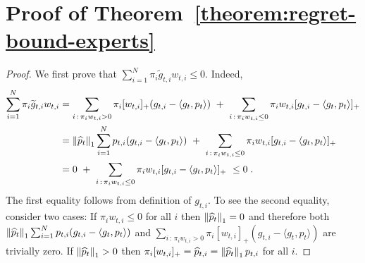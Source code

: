 \section{Proof of Theorem~\ref{theorem:regret-bound-experts}}
\label{section:appendix-expert-reduction}

\begin{proof}
We first prove that $\sum_{i=1}^N \pi_i \widetilde g_{t,i} w_{t,i} \le 0$. Indeed,
\begin{align*}
\sum_{i=1}^N \pi_i \widetilde g_{t,i} w_{t,i}
& = \sum_{i \, : \, \pi_i w_{t,i} > 0} \pi_i [w_{t,i}]_+ (g_{t,i} - \langle g_t, p_t \rangle)  \ + \ \sum_{i \, : \, \pi_i w_{t,i} \le 0} \pi_i w_{t,i} [g_{t,i} - \langle g_t, p_t \rangle ]_+ \\
& = \left\|{\widehat p_t}\right\|_1 \sum_{i=1}^N p_{t,i} (g_{t,i} - \langle g_t, p_t \rangle)  \ + \ \sum_{i \, : \, \pi_i w_{t,i} \le 0} \pi_i w_{t,i} [g_{t,i} - \langle g_t, p_t\rangle]_+ \\
& = 0 \ + \ \sum_{i \, : \, \pi_i w_{t,i} \le 0} \pi_i w_{t,i} [g_{t,i} - \langle g_t, p_t\rangle]_+
\ \le 0 \; .
\end{align*}
The first equality follows from definition of $g_{t,i}$. To see the second
equality, consider two cases: If $\pi_i w_{t,i} \le 0$ for all $i$ then
$\left\|{\widehat p_t}\right\|_1 = 0$ and therefore both $\left\|{\widehat p_t}\right\|_1
\sum_{i=1}^N p_{t,i} (g_{t,i} - \langle g_t, p_t \rangle)$ and $\sum_{i \, : \,
\pi_i w_{t,i} > 0} \pi_i [w_{t,i}]_+ (g_{t,i} - \langle g_t, p_t \rangle)$ are
trivially zero.  If $\left\|{\widehat p_t}\right\|_1 > 0$ then $\pi_i [w_{t,i}]_+ =
\widehat p_{t,i} = \left\|{\widehat p_t}\right\|_1 p_{t,i}$ for all $i$.


\end{proof}
